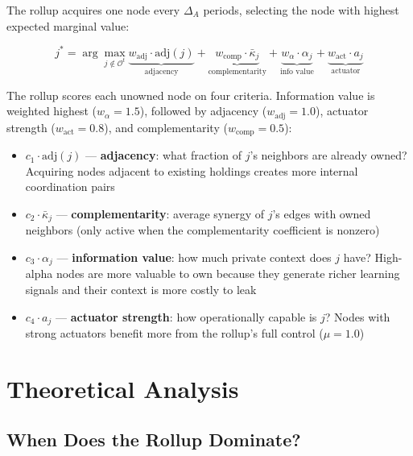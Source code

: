 \documentclass[12pt]{article}
\theoremstyle{definition}
\begin{document}
The rollup acquires one node every $\Delta_A$ periods, selecting the node with highest expected marginal value:

\begin{equation}
j^* = \arg\max_{j \notin \mathcal{O}^t} \underbrace{w_{\text{adj}} \cdot \text{adj}(j)}_{\text{adjacency}} + \underbrace{w_{\text{comp}} \cdot \bar{\kappa}_j}_{\text{complementarity}} + \underbrace{w_{\alpha} \cdot \alpha_j}_{\text{info value}} + \underbrace{w_{\text{act}} \cdot a_j}_{\text{actuator}}
\end{equation}

\noindent The rollup scores each unowned node on four criteria. Information value is weighted highest ($w_\alpha = 1.5$), followed by adjacency ($w_{\text{adj}} = 1.0$), actuator strength ($w_{\text{act}} = 0.8$), and complementarity ($w_{\text{comp}} = 0.5$):
\begin{itemize}[leftmargin=*]
\item $c_1 \cdot \text{adj}(j)$ --- \textbf{adjacency}: what fraction of $j$'s neighbors are already owned? Acquiring nodes adjacent to existing holdings creates more internal coordination pairs
\item $c_2 \cdot \bar{\kappa}_j$ --- \textbf{complementarity}: average synergy of $j$'s edges with owned neighbors (only active when the complementarity coefficient is nonzero)
\item $c_3 \cdot \alpha_j$ --- \textbf{information value}: how much private context does $j$ have? High-alpha nodes are more valuable to own because they generate richer learning signals and their context is more costly to leak
\item $c_4 \cdot a_j$ --- \textbf{actuator strength}: how operationally capable is $j$? Nodes with strong actuators benefit more from the rollup's full control ($\mu = 1.0$)
\end{itemize}

\section{Theoretical Analysis}

\subsection{When Does the Rollup Dominate?}
\end{document}
